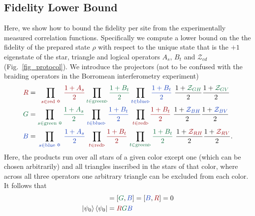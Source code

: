 \documentclass[nofootinbib,pra,twocolumn,showpacs,superscriptaddress,notitlepage,amsmath]{revtex4-2} %
\begin{document}
\subsection{Fidelity Lower Bound}
\label{app_fidelity_lower_bound}
Here, we show how to bound the fidelity per site from the experimentally measured correlation functions. Specifically we compute a lower bound on the the fidelity of the prepared state $\rho$ with respect to the unique state that is the $+1$ eigenstate of the star, triangle and logical operators $A_s$, $B_t$ and $\mathcal{Z}_{cd}$ (Fig.~\ref{fig_protocol}). We introduce the projectors (not to be confused with the braiding operators in the Borromean interferometry experiment)
\begin{align}
\begin{split}
    \red{R} &= \,\,\, \prod_{\red{s \in \text{red \ding{65}}}} \,\,\red{\frac{1+A_s}{2}}
    \prod_{\green{t \in \text{green} \triangleright}} \green{\frac{1+B_t}{2}} \prod_{\blue{t \in \text{blue} \triangleright}} \blue{\frac{1+B_t}{2}}
    \,\,\frac{1+\green{\mathcal{Z}_{GH}}}{2} \frac{1+\green{\mathcal{Z}_{GV}}}{2} \\
    \green{G} &= \prod_{\green{s \in \text{green \ding{65}}}} \green{\frac{1+A_s}{2}}
    \, \prod_{\blue{t \in \text{blue} \triangleright}} \, \blue{\frac{1+B_t}{2}} \,\, \prod_{\red{t \in \text{red} \triangleright}} \red{\frac{1+B_t}{2}}
    \,\,\frac{1+\blue{\mathcal{Z}_{BH}}}{2} \frac{1+\blue{\mathcal{Z}_{BV}}}{2} \\
    \blue{B} &= \, \prod_{\blue{s \in \text{blue \ding{65}}}} \,\, \blue{\frac{1+A_s}{2}}
    \,\,\prod_{\red{t \in \text{red} \triangleright}} \red{\frac{1+B_t}{2}} \, \prod_{\green{t \in \text{green} \triangleright}} \green{\frac{1+B_t}{2}}
    \,\, \frac{1+\red{\mathcal{Z}_{RH}}}{2} \frac{1+\red{\mathcal{Z}_{RV}}}{2}.
\end{split}
\end{align}
Here, the products run over all stars of a given color except one (which can be chosen arbitrarily) and all triangles inscribed in the stars of that color, where across all three operators one arbitrary triangle can be excluded from each color. It follows that
\begin{align}
    [\red{R}, \green{G}] &= [\green{G}, \blue{B}] = [\blue{B},\red{R}] = 0 \\
    \ket{\psi_0} \bra{\psi_0} &= \red{R} \green{G} \blue{B}
\end{align}
\end{document}
